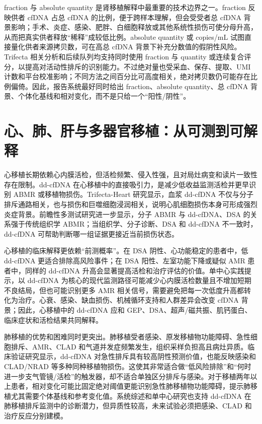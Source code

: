 \documentclass[11pt,a4paper]{article}
\begin{document}
fraction 与 absolute quantity
是肾移植解释中最重要的技术边界之一。fraction 反映供者 cfDNA
占总 cfDNA 的比例，便于跨样本理解，但会受受者总 cfDNA
背景影响；手术、炎症、感染、肥胖、白细胞释放或其他系统性损伤可使分母升高，从而把真实供者释放``稀释''成较低比例。absolute
quantity 或 copies/mL
试图直接量化供者来源拷贝数，可在高总 cfDNA 背景下补充分数值的假阴性风险。Trifecta
相关分析和后续队列均支持同时使用 fraction 与 quantity
或连续复合评分，以提高对活动性排斥的识别能力\cite{usingboththe2021, combiningdonorderived2022, improvingdiagnosticperformance2025}。不过绝对量也受采血、保存、提取、UMI
计数和平台校准影响；不同方法之间百分比可高度相关，绝对拷贝数仍可能存在比例偏倚\cite{comparisonofmethods2023, dropletdigitalpcr2023}。因此，报告系统最好同时给出
fraction、absolute quantity、总 cfDNA 背景、个体化基线和相对变化，而不是只给一个``阳性/阴性''。

\section{心、肺、肝与多器官移植：从可测到可解释}\label{ux5fc3ux80baux809dux4e0eux591aux5668ux5b98ux79fbux690dux4eceux53efux6d4bux5230ux53efux89e3ux91ca}

心移植长期依赖心内膜活检，但活检频繁、侵入性强，且对局灶病变和读片一致性存在限制。dd-cfDNA
在心移植中的直接吸引力，是减少低收益监测活检并更早识别 ABMR
或移植物损伤。Trifecta-Heart 研究显示，血浆 dd-cfDNA
不仅与分子排斥通路相关，也与损伤和巨噬细胞浸润相关，说明心肌细胞损伤本身可形成强烈炎症背景\cite{comparingplasmadonor2024}。前瞻性多测试研究进一步显示，分子
ABMR 与 dd-cfDNA、DSA 的关系强于传统组织学 ABMR；当组织学、分子诊断、DSA
和 dd-cfDNA 不一致时，dd-cfDNA
可帮助判断哪一组证据更接近当前损伤状态\cite{definingtherelationships2025}。

心移植的临床解释更依赖``前测概率''。在 DSA
阴性、心功能稳定的患者中，低 dd-cfDNA
更适合排除高风险事件；在 DSA 阳性、左室功能下降或疑似 AMR
患者中，同样的 dd-cfDNA
升高会显著提高活检和治疗评估的价值\cite{redefiningcardiacantibody2024, donorderivedcell20253}。单中心实践提示，以
dd-cfDNA 为核心的现代监测路径可能减少心内膜活检数量且不增加短期不良结局，但也可能识别更多 AMR
相关信号，需要避免把每一次低度升高都转化为治疗\cite{amodernheart2024, initiationofnoninvasive2021}。心衰、感染、缺血损伤、机械循环支持和人群差异会改变
cfDNA 背景；因此，心移植中的 dd-cfDNA
应和 GEP、DSA、超声/磁共振、肌钙蛋白、临床症状和活检结果共同解释\cite{racialdifferencesin2024, europeansocietyfor2024}。

肺移植的优势和困难同时更突出。肺移植受者感染、原发移植物功能障碍、急性细胞排斥、AMR、CLAD
和气道并发症频繁发生，组织采样负担高且病灶异质。临床验证研究显示，dd-cfDNA
对急性排斥具有较高阴性预测价值，也能反映感染和 CLAD/NRAD
等多种同种移植物损伤\cite{clinicalvalidationof2022, cellfreedna2022}。这使其非常适合做``低风险排除''和``何时进一步支气管镜/活检''的触发器，却不适合单独区分排斥与感染。对于移植两年以上患者，相对变化可能比固定绝对阈值更能识别急性肺移植物功能障碍，提示肺移植尤其需要个体基线和参考变化值\cite{relativechangein2023}。系统综述和单中心研究也支持
dd-cfDNA 在肺移植排斥监测中的诊断潜力，但异质性较高，未来试验必须把感染、CLAD
和治疗反应分别建模\cite{circulatingdonorderived2023, applicationofplasma2023, whycellfree2022}。
\end{document}
